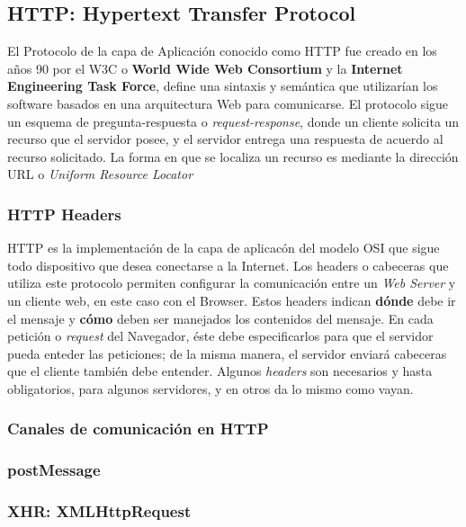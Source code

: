     \subsection{HTTP: Hypertext Transfer Protocol}
    \label{chap2:HTTP}
    El Protocolo de la capa de Aplicación conocido como HTTP fue creado en los años 90 por el W3C o \textbf{World Wide Web Consortium} y la \textbf{Internet Engineering Task Force}, define una sintaxis y semántica que utilizarían los software basados en una arquitectura Web para comunicarse. El protocolo sigue un esquema de pregunta-respuesta o \textit{request-response}, donde un cliente solicita un recurso que el servidor posee, y el servidor entrega una respuesta de acuerdo al recurso solicitado. La forma en que se localiza un recurso es mediante la dirección URL o \textit{Uniform Resource Locator}

        \subsubsection{HTTP Headers}
        \label{chap2:headers}
        HTTP es la implementación de la capa de aplicacón del modelo OSI que sigue todo dispositivo que desea conectarse a la Internet. Los headers o cabeceras que utiliza este protocolo permiten configurar la comunicación entre un \textit{Web Server} y un cliente web, en este caso con el Browser. Estos headers indican \textbf{dónde} debe ir el mensaje y \textbf{cómo} deben ser manejados los contenidos del mensaje. En cada petición o \textit{request} del Navegador, éste debe especificarlos para que el servidor pueda enteder las peticiones; de la misma manera, el servidor enviará cabeceras que el cliente también debe entender. Algunos \textit{headers} son necesarios y hasta obligatorios, para algunos servidores, y en otros da lo mismo como vayan.

        \subsubsection{Canales de comunicación en HTTP}
        \label{chap2:comunHTTP}

        \subsubsection{postMessage}
        \label{chap2:postmessage}

        \subsubsection{XHR: XMLHttpRequest}
        \label{chap2:XMLHR}

